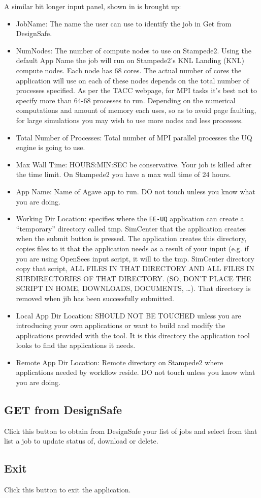 A similar bit longer input panel, shown in 
is brought up:
\begin{itemize}
\item JobName: The name the user can use to identify the job in Get from DesignSafe.
\item NumNodes: The number of compute nodes to use on Stampede2. Using the default App Name the job will run on Stampede2’s KNL Landing (KNL) 
compute nodes. Each node has 68 cores. The actual number of cores the
application will use on each of these nodes depends on the total
number of processes specified. As per the TACC webpage, for MPI tasks
it’s best not to specify more than 64-68 processes to run. Depending
on the numerical computations and amount of memory each uses, so as to
avoid page faulting, for large simulations you may wish to use more
nodes and less processes.
\item Total Number of Processes: Total number of MPI parallel processes the UQ engine is going to use.
\item Max Wall Time:  HOURS:MIN:SEC be conservative. Your job is killed after the time limit. On Stampede2 you have a max wall time of 24 hours.
\item App Name:   Name of Agave app to run. DO not touch unless you know what you are doing.
\item Working Dir Location: specifies where the \texttt{EE-UQ} application can create a “temporary” directory called tmp. SimCenter that the application 
creates when the submit button is pressed. The application creates
this directory, copies files to it that the application needs as a
result of your input (e.g. if you are using OpenSees input script, it
will to the tmp. SimCenter directory copy that script, ALL FILES IN
THAT DIRECTORY AND ALL FILES IN SUBDIRECTORIES OF THAT DIRECTORY. (SO,
DON’T PLACE THE SCRIPT IN HOME, DOWNLOADS, DOCUMENTS, …). That
directory is removed when jib has been successfully submitted.
\item Local App Dir Location: SHOULD NOT BE TOUCHED unless you are introducing your own applications or want to build and modify the applications 
provided with the tool. It is this directory the application tool
looks to find the applications it needs.
\item Remote App Dir Location: Remote directory on Stampede2 where applications needed by workflow reside. DO not touch unless you know what you are doing.

\end{itemize}

\subsection{GET from DesignSafe}
Click this button to obtain from DesignSafe your list of jobs and
select from that list a job to update status of, download or delete.

\subsection{Exit}
Click this button to exit the application. 
